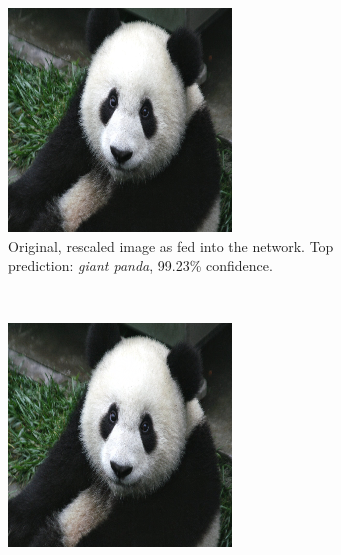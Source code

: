 \documentclass[11pt, a4paper]{article}
\begin{document}
\begin{figure}[h!tb]
    \centering
    \begin{subfigure}[t]{0.45\textwidth}
        \includegraphics[width=\textwidth]{aes/panda.png}
        \caption{Original, rescaled image as fed into the network. Top prediction: \emph{giant panda}, 99.23\% confidence.}
        \label{fig:ae-example-original}
    \end{subfigure}
    ~ %
    \begin{subfigure}[t]{0.45\textwidth}
        \includegraphics[width=\textwidth]{aes/panda_acorn_10_0dot9.png}

\end{subfigure}
\end{figure}
\end{document}
